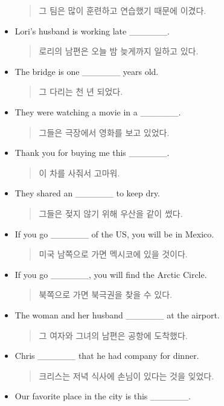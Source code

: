 \documentclass{article}
\begin{document}
\begin{addmargin}[1em]{1em}
\begin{itemize}
    \begin{quote}
    그 팀은 많이 훈련하고 연습했기 때문에 이겼다.
    \end{quote}
    \item Lori's husband is working late \_\_\_\_\_\_.
    \begin{quote}
    로리의 남편은 오늘 밤 늦게까지 일하고 있다.
    \end{quote}
    \item The bridge is one \_\_\_\_\_\_ years old.
    \begin{quote}
    그 다리는 천 년 되었다.
    \end{quote}
    \item They were watching a movie in a \_\_\_\_\_\_.
    \begin{quote}
    그들은 극장에서 영화를 보고 있었다.
    \end{quote}
    \item Thank you for buying me this \_\_\_\_\_\_.
    \begin{quote}
    이 차를 사줘서 고마워.
    \end{quote}
    \newpage
    \item They shared an \_\_\_\_\_\_ to keep dry.
    \begin{quote}
    그들은 젖지 않기 위해 우산을 같이 썼다.
    \end{quote}
    \item If you go \_\_\_\_\_\_ of the US, you will be in Mexico.
    \begin{quote}
    미국 남쪽으로 가면 멕시코에 있을 것이다.
    \end{quote}
    \item If you go \_\_\_\_\_\_, you will find the Arctic Circle.
    \begin{quote}
    북쪽으로 가면 북극권을 찾을 수 있다.
    \end{quote}
    \item The woman and her husband \_\_\_\_\_\_ at the airport.
    \begin{quote}
    그 여자와 그녀의 남편은 공항에 도착했다.
    \end{quote}
    \item Chris \_\_\_\_\_\_ that he had company for dinner.
    \begin{quote}
    크리스는 저녁 식사에 손님이 있다는 것을 잊었다.
    \end{quote}
    \item Our favorite place in the city is this \_\_\_\_\_\_.
    \begin{quote}

\end{quote}
\end{itemize}
\end{addmargin}
\end{document}
